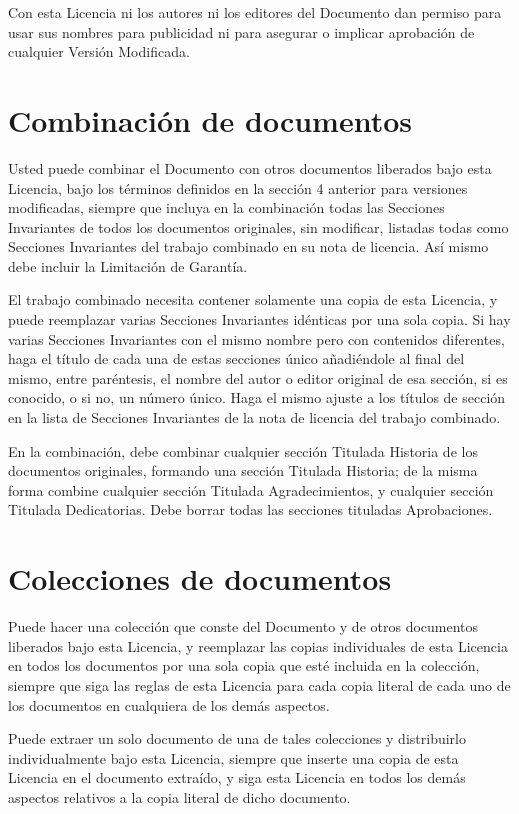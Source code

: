 Con esta Licencia ni los autores ni los editores del Documento dan
permiso para usar sus nombres para publicidad ni para asegurar o implicar
aprobación de cualquier Versión Modificada.

\section{Combinación de documentos}

Usted puede combinar el Documento con otros documentos liberados bajo
esta Licencia, bajo los términos definidos en la sección 4 anterior
para versiones modificadas, siempre que incluya en la combinación
todas las Secciones Invariantes de todos los documentos originales,
sin modificar, listadas todas como Secciones Invariantes del trabajo
combinado en su nota de licencia. Así mismo debe incluir la Limitación
de Garantía.

El trabajo combinado necesita contener solamente una copia de esta
Licencia, y puede reemplazar varias Secciones Invariantes idénticas
por una sola copia. Si hay varias Secciones Invariantes con el mismo
nombre pero con contenidos diferentes, haga el título de cada una
de estas secciones único añadiéndole al final del mismo, entre paréntesis,
el nombre del autor o editor original de esa sección, si es conocido,
o si no, un número único. Haga el mismo ajuste a los títulos de sección
en la lista de Secciones Invariantes de la nota de licencia del trabajo
combinado.

En la combinación, debe combinar cualquier sección Titulada Historia
de los documentos originales, formando una sección Titulada Historia;
de la misma forma combine cualquier sección Titulada Agradecimientos,
y cualquier sección Titulada Dedicatorias. Debe borrar todas las secciones
tituladas Aprobaciones.

\section{Colecciones de documentos}

Puede hacer una colección que conste del Documento y de otros documentos
liberados bajo esta Licencia, y reemplazar las copias individuales
de esta Licencia en todos los documentos por una sola copia que esté
incluida en la colección, siempre que siga las reglas de esta Licencia
para cada copia literal de cada uno de los documentos en cualquiera
de los demás aspectos.

Puede extraer un solo documento de una de tales colecciones y distribuirlo
individualmente bajo esta Licencia, siempre que inserte una copia
de esta Licencia en el documento extraído, y siga esta Licencia en
todos los demás aspectos relativos a la copia literal de dicho documento.

